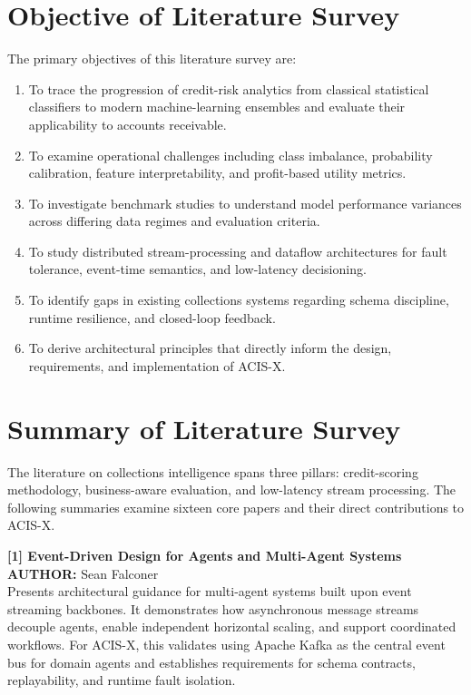 \documentclass[a4paper, 12pt]{report}
\begin{document}
\section{Objective of Literature Survey}
The primary objectives of this literature survey are:
\begin{enumerate}[label=\roman*., itemsep=2pt]
    \item To trace the progression of credit-risk analytics from classical statistical classifiers to modern machine-learning ensembles and evaluate their applicability to accounts receivable.
    \item To examine operational challenges including class imbalance, probability calibration, feature interpretability, and profit-based utility metrics.
    \item To investigate benchmark studies to understand model performance variances across differing data regimes and evaluation criteria.
    \item To study distributed stream-processing and dataflow architectures for fault tolerance, event-time semantics, and low-latency decisioning.
    \item To identify gaps in existing collections systems regarding schema discipline, runtime resilience, and closed-loop feedback.
    \item To derive architectural principles that directly inform the design, requirements, and implementation of ACIS-X.
\end{enumerate}

\section{Summary of Literature Survey}
The literature on collections intelligence spans three pillars: credit-scoring methodology, business-aware evaluation, and low-latency stream processing. The following summaries examine sixteen core papers and their direct contributions to ACIS-X.

\noindent \textbf{[1] Event-Driven Design for Agents and Multi-Agent Systems}\\
\textbf{AUTHOR:} Sean Falconer\\
Presents architectural guidance for multi-agent systems built upon event streaming backbones. It demonstrates how asynchronous message streams decouple agents, enable independent horizontal scaling, and support coordinated workflows. For ACIS-X, this validates using Apache Kafka as the central event bus for domain agents and establishes requirements for schema contracts, replayability, and runtime fault isolation.
\end{document}
